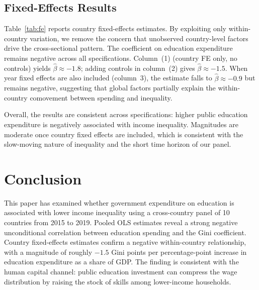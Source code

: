 \documentclass[12pt,a4paper]{article}
\begin{document}
\subsection{Fixed-Effects Results}

Table~\ref{tab:fe} reports country fixed-effects estimates. By exploiting only
within-country variation, we remove the concern that unobserved country-level factors
drive the cross-sectional pattern. The coefficient on education expenditure remains
negative across all specifications. Column~(1) (country FE only, no controls) yields
$\hat{\beta} \approx -1.8$; adding controls in column~(2) gives $\hat{\beta} \approx -1.5$.
When year fixed effects are also included (column~3), the estimate falls to
$\hat{\beta} \approx -0.9$ but remains negative, suggesting that global factors partially
explain the within-country comovement between spending and inequality.

\begin{table}[H]
  \centering
  \caption{Fixed-effects estimates: education expenditure and income inequality}
  \label{tab:fe}
  
\end{table}

Overall, the results are consistent across specifications: higher public education
expenditure is negatively associated with income inequality. Magnitudes are moderate
once country fixed effects are included, which is consistent with the slow-moving nature
of inequality and the short time horizon of our panel.

\section{Conclusion}
\label{sec:conclusion}

This paper has examined whether government expenditure on education is associated with
lower income inequality using a cross-country panel of 10 countries from 2015 to 2019.
Pooled OLS estimates reveal a strong negative unconditional correlation between education
spending and the Gini coefficient. Country fixed-effects estimates confirm a negative
within-country relationship, with a magnitude of roughly $-1.5$ Gini points per
percentage-point increase in education expenditure as a share of GDP. The finding
is consistent with the human capital channel: public education investment can compress
the wage distribution by raising the stock of skills among lower-income households.
\end{document}
